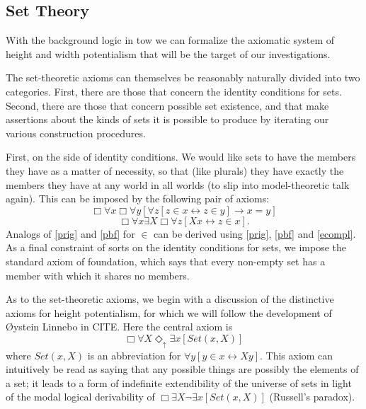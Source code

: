 \documentclass{article}
\theoremstyle{definition}
\newcommand{\du}{\Diamond_\uparrow}
\begin{document}
\subsection{Set Theory}
With the background logic in tow we can formalize the axiomatic system of height
and width potentialism that will be the target of our investigations.

The set-theoretic axioms can themselves be reasonably naturally divided into two categories.
First, there are those that concern the identity conditions for sets. Second, there are those 
that concern possible set existence, and that make assertions about the kinds of sets it is 
possible to produce by iterating our various construction procedures.

First, on the side of identity conditions. We would like sets to have the members they have as a matter of 
necessity, so that (like plurals) they have exactly the members they have at any world in all worlds
(to slip into model-theoretic talk again). This can be imposed by the following pair of axioms:
\begin{equation}
   \Box \forall x \Box \forall y[\forall z[z \in x \leftrightarrow z \in y] \rightarrow x = y]
\end{equation}
\begin{equation}\label{ecompl}
    \Box \forall x\exists X\Box\forall z[Xx \leftrightarrow z \in x].
\end{equation} 
Analogs of \eqref{prig} and \eqref{pbf} for $\in$ can be derived using \eqref{prig}, \eqref{pbf}
and \eqref{ecompl}. As a final constraint of sorts on the identity conditions for sets, we 
impose the standard axiom of foundation, which says that every non-empty set has a member with 
which it shares no members. 

As to the set-theoretic axioms, we begin with a discussion 
of the distinctive axioms for height potentialism, for which we will 
follow the development of \O ystein Linnebo in CITE.
Here the central axiom is 
\begin{equation}\label{hpot}
    \Box \forall X \du \exists x[Set(x, X)]
\end{equation}
where $Set(x, X)$ is an abbreviation for $\forall y[ y \in x \leftrightarrow Xy]$. This 
axiom can intuitively be read as saying that any possible things are possibly the elements of a set;
it leads to a form of indefinite extendibility of the universe of sets in light of the modal logical 
derivability of $\Box \exists X \neg \exists x[Set(x, X)]$ (Russell's paradox).
\end{document}
